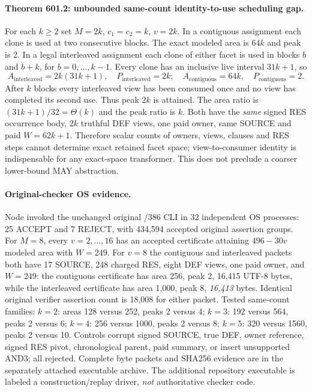 \documentclass[11pt]{article}
\begin{document}
\paragraph{Theorem 601.2: unbounded same-count identity-to-use scheduling gap.}
For each $k\ge2$ set $M=2k$, $c_1=c_2=k$, $v=2k$. In a contiguous assignment each clone is used at two consecutive blocks. The exact modeled area is $64k$ and peak is 2. In a legal interleaved assignment each clone of either facet is used in blocks $b$ and $b+k$, for $b=0,\ldots,k-1$. Every clone has an inclusive live interval $31k+1$, so
\[
\boxed{A_{\mathrm{interleaved}}=2k(31k+1),\quad P_{\mathrm{interleaved}}=2k;\quad A_{\mathrm{contiguous}}=64k,\quad P_{\mathrm{contiguous}}=2.}
\]
After $k$ blocks every interleaved view has been consumed once and no view has completed its second use. Thus peak $2k$ is attained. The area ratio is $(31k+1)/32=\Theta(k)$ and the peak ratio is $k$. Both have the \emph{same} signed RES occurrence body, $2k$ truthful DEF views, one paid owner, same SOURCE and paid $W=62k+1$. Therefore scalar counts of owners, views, clauses and RES steps cannot determine exact retained facet space; view-to-consumer identity is indispensable for any exact-space transformer. This does not preclude a coarser lower-bound MAY abstraction.

\paragraph{Original-checker OS evidence.}
Node invoked the unchanged original /386 CLI in 32 independent OS processes: 25 ACCEPT and 7 REJECT, with 434,594 accepted original assertion groups. For $M=8$, every $v=2,\ldots,16$ has an accepted certificate attaining $496-30v$ modeled area with $W=249$. For $v=8$ the contiguous and interleaved packets both have 17 SOURCE, 248 charged RES, eight DEF views, one paid owner, and $W=249$: the contiguous certificate has area 256, peak 2, 16,415 UTF-8 bytes, while the interleaved certificate has area 1,000, peak 8, \emph{16,413} bytes. Identical original verifier assertion count is 18,008 for either packet. Tested same-count families: $k=2$: areas 128 versus 252, peaks 2 versus 4; $k=3$: 192 versus 564, peaks 2 versus 6; $k=4$: 256 versus 1000, peaks 2 versus 8; $k=5$: 320 versus 1560, peaks 2 versus 10. Controls corrupt signed SOURCE, true DEF, owner reference, signed RES pivot, chronological parent, paid summary, or insert unsupported AND3; all rejected. Complete byte packets and SHA256 evidence are in the separately attached executable archive. The additional repository executable is labeled a construction/replay driver, \emph{not} authoritative checker code.
\end{document}
